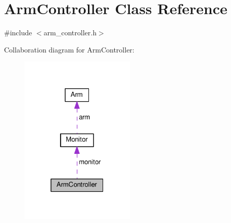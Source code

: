 \hypertarget{class_arm_controller}{}\section{Arm\+Controller Class Reference}
\label{class_arm_controller}


{\ttfamily \#include $<$arm\+\_\+controller.\+h$>$}



Collaboration diagram for Arm\+Controller\+:\nopagebreak
\begin{figure}[H]
\begin{center}
\leavevmode
\includegraphics[width=157pt]{class_arm_controller__coll__graph}
\end{center}
\end{figure}
